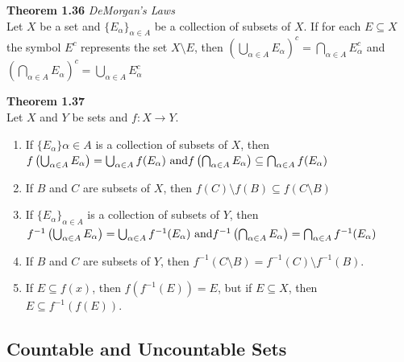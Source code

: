 \documentclass[8pt,landscape]{article}
\begin{document}
\begin{multicols}{3}
    \textbf{Theorem 1.36} \emph{DeMorgan's Laws} \\
    Let $X$ be a set and ${\{ E_\alpha \}}_{\alpha \in A}$ be a collection of subsets of
    $X$.
    If for each $E \subseteq X$ the symbol $E^c$ represents the set $X \setminus E$, then
    ${\left( \bigcup_{\alpha \in A} E_\alpha \right)}^c =
    \bigcap_{\alpha \in A} E_\alpha^c$
    and
    ${\left( \bigcap_{\alpha \in A} E_\alpha \right)}^c =
    \bigcup_{\alpha \in A} E_\alpha ^c$


    \textbf{Theorem 1.37} \\
    Let $X$ and $Y$ be sets and $f : X \to Y$.
    \begin{enumerate}
        \item If ${\{ E_\alpha \}}{\alpha \in A}$ is a collection of subsets of $X$, then \\
            $f \left( \bigcup_{\alpha \in A} E_\alpha \right) =
            \bigcup_{\alpha \in A} f(E_\alpha) \ \text{and} \\
            f \left( \bigcap_{\alpha \in A} E_\alpha \right) \subseteq
            \bigcap_{\alpha \in A} f(E_\alpha)$
        \item If $B$ and $C$ are subsets of $X$, then
            $f(C) \setminus f(B) \subseteq f(C \setminus B)$
        \item If ${\{E_\alpha\}}_{\alpha \in A}$ is a collection of subsets of $Y$, then
            $f^{-1} \left( \bigcup_{\alpha \in A} E_\alpha \right) =
            \bigcup_{\alpha \in A} f^{-1} (E_\alpha) \ \text{and} \ \\
            f^{-1} \left( \bigcap_{\alpha \in A} E_\alpha \right) =
            \bigcap_{\alpha \in A} f^{-1} (E_\alpha)$
        \item If $B$ and $C$ are subsets of $Y$, then
            $f^{-1}(C \setminus B) = f^{-1}(C) \setminus f^{-1}(B)$.
        \item If $E \subseteq f(x)$, then $f(f^{-1}(E)) = E$, but if $E \subseteq X$,
            then $E \subseteq f^{-1}(f(E))$.
    \end{enumerate}



    \subsection{Countable and Uncountable Sets}




\end{multicols}
\end{document}
